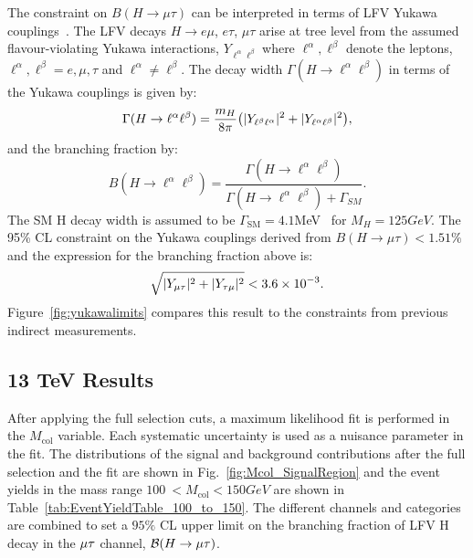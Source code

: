 \documentclass[oneside, letterpaper, oldfontcommands]{memoir}
\DeclarePairedDelimiter{\abs}{\lvert}{\rvert}
\begin{document}
{{{The constraint on $B(H \rightarrow \mu \tau )$ can be interpreted in terms of LFV  Yukawa couplings~\cite{Harnik:2012pb}.
The LFV decays $H \rightarrow e\mu$, $e\tau$, $\mu\tau$ arise at tree level from the assumed
flavour-violating Yukawa interactions, $Y_{\ell^{\alpha}\ell^{\beta}}$ where $\ell^{\alpha},\ell^{\beta}$ denote the leptons, $\ell^{\alpha},\ell^{\beta}=e,\mu,\tau$ and $\ell^{\alpha}\neq \ell^{\beta}$.
The decay width $\Gamma(H \rightarrow \ell^{\alpha}\ell^{\beta})$  in terms of the Yukawa couplings is given by:
\begin{equation*}
\Gamma(H \rightarrow \ell^{\alpha}\ell^{\beta})=\frac{m_{H}}{8\pi}\bigl(\abs{Y_{\ell^{\beta}\ell^{\alpha}}}^2 + \abs{Y_{\ell^{\alpha}\ell^{\beta}}}^2\bigr),
\end{equation*}
and the branching fraction by:
\begin{equation*}
B(H \rightarrow \ell^{\alpha}\ell^{\beta})=\frac{\Gamma(H\rightarrow \ell^{\alpha}\ell^{\beta})}{\Gamma(H\rightarrow \ell^{\alpha}\ell^{\beta}) + \Gamma_{SM}}.
\end{equation*}
The SM H decay width is assumed to be $\Gamma_{\mathrm{SM}}=4.1$MeV~\cite{Denner:2011mq} for $M_{H}=125GeV$.
The 95\% CL constraint on the Yukawa couplings derived from $B(H \rightarrow \mu \tau )<1.51\%$ and the expression for the branching fraction above is:\begin{equation*}
\sqrt{\abs{Y_{\mu\tau}}^{2}+\abs{Y_{\tau\mu}}^{2}}<3.6\times 10^{-3}.
\end{equation*}
Figure~\ref{fig:yukawalimits} compares this result to the constraints from previous indirect
measurements.
\subsection{13 TeV Results}
After applying the full selection cuts, a maximum likelihood fit is performed in the $M_\text{col}$ variable. Each systematic uncertainty is used as a nuisance parameter in the fit. The distributions of the signal and background contributions after the full selection and the fit are shown in Fig.~\ref{fig:Mcol_SignalRegion} and the
event yields in the mass range $100\:  < M_\text{col} < 150GeV$ are shown in Table~\ref{tab:EventYieldTable_100_to_150}.
The different channels and categories are combined  to set a $95\%$ CL  upper limit on the branching
fraction of LFV H decay in the  $\mu\mathrm{\tau}$ channel, $\mathcal{B}(H\rightarrow\mu\mathrm{\tau})$.

}}}
\end{document}
